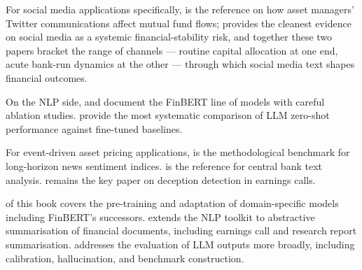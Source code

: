 For social media applications specifically, \citet{gilbazo2025tweeting} is the reference on how asset managers' Twitter communications affect mutual fund flows; \citet{cookson2026bankrun} provides the cleanest evidence on social media as a systemic financial-stability risk, and together these two papers bracket the range of channels --- routine capital allocation at one end, acute bank-run dynamics at the other --- through which social media text shapes financial outcomes.

On the NLP side, \citet{araci2019finbert} and \citet{huang2023finbert} document the FinBERT line of models with careful ablation studies. \citet{ko2024can} provide the most systematic comparison of LLM zero-shot performance against fine-tuned baselines.

For event-driven asset pricing applications, \citet{manela2017news} is the methodological benchmark for long-horizon news sentiment indices. \citet{schmeling2019does} is the reference for central bank text analysis. \citet{larcker2012detecting} remains the key paper on deception detection in earnings calls.

 of this book covers the pre-training and adaptation of domain-specific models including FinBERT's successors.  extends the NLP toolkit to abstractive summarisation of financial documents, including earnings call and research report summarisation.  addresses the evaluation of LLM outputs more broadly, including calibration, hallucination, and benchmark construction.
